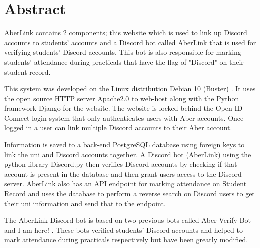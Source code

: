 \thispagestyle{empty}


\section*{\centering Abstract}

AberLink contains 2 components; this website which is used to link up Discord \cite{discord} accounts to students' accounts and a Discord bot called AberLink that is used for verifying students' Discord accounts. This bot is also responsible for marking students' attendance during practicals that have the flag of "Discord" on their student record.

This system was developed on the Linux distribution Debian 10 (Buster) \cite{debian}. It uses the open source HTTP server Apache2.0 \cite{apache2} to web-host along with the Python framework Django \cite{Django} for the website. The website is locked behind the Open-ID Connect \cite{OpenID} login system that only authenticates users with Aber accounts. Once logged in a user can link multiple Discord accounts to their Aber account. 

Information is saved to a back-end  PostgreSQL \cite{psql} database using foreign keys to link the uni and Discord accounts together. A Discord bot (AberLink) using the python library Discord.py \cite{discord.py} then verifies Discord accounts by checking if that account is present in the database and then grant users access to the Discord server. AberLink also has an API endpoint for marking attendance on Student Record and uses the database to perform a reverse search on Discord users to get their uni information and send that to the endpoint.

The AberLink Discord bot is based on two previous bots called Aber Verify Bot \cite{aber_verify} and I am here! \cite{i_am_here}. These bots verified students' Discord accounts and helped to mark attendance during practicals respectively but have been greatly modified.

